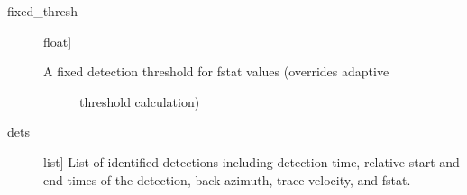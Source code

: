 \documentclass[letterpaper,10pt,english]{sphinxmanual}
\begin{document}
\begin{fulllineitems}
\begin{description}
\item[{fixed\_thresh}] \leavevmode{[}float{]}\begin{description}
\item[{A fixed detection threshold for fstat values (overrides adaptive }] \leavevmode
threshold calculation)

\end{description}

\end{description}
\begin{description}
\item[{dets}] \leavevmode{[}list{]}
List of identified detections including detection time, relative start
and end times of the detection, back azimuth, trace velocity, and f\sphinxhyphen{}stat.

\end{description}

\end{fulllineitems}

\end{document}

